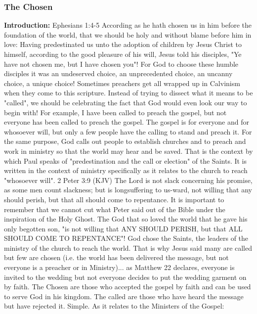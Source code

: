 \subsubsection{The Chosen}
\textbf{Introduction:} Ephesians 1:4-5  According as he hath chosen us in him before the foundation of the world, that we should be holy and without blame before him in love:
Having predestinated us unto the adoption of children by Jesus Christ to himself, according to the good pleasure of his will,
Jesus told his disciples, "Ye have not chosen me, but I have chosen you"!  
For God to choose these humble disciples it was an undeserved choice, an unprecedented choice, an uncanny choice, a unique choice!
Sometimes preachers get all wrapped up in Calvinism when they come to this scripture. Instead of trying to dissect what it means to be "called", we should be celebrating the fact that God would even look our way to begin with!
For example, I have been called to preach the gospel, but not everyone has been called to preach the gospel. The gospel is for everyone and for whosoever will, but only a few people have the calling to stand and preach it. 
For the same purpose, God calls out people to establish churches and to preach and work in ministry so that the world may hear and be saved. That is the context by which Paul speaks of "predestination and the call or election" of the Saints. It is written in the context of ministry specifically as it relates to the church to reach "whosoever will".
2 Peter 3:9 (KJV)  The Lord is not slack concerning his promise, as some men count slackness; but is longsuffering to us-ward, not willing that any should perish, but that all should come to repentance.
It is important to remember that we cannot cut what Peter said out of the Bible under the inspiration of the Holy Ghost. The God that so loved the world that he gave his only begotten son, "is not willing that ANY SHOULD PERISH, but that ALL SHOULD COME TO REPENTANCE"!  God chose the Saints, the leaders of the ministry of the church to reach the world. That is why Jesus said many are called but few are chosen (i.e. the world has been delivered the message, but not everyone is a preacher or in Ministry)... as Matthew 22 declares, everyone is invited to the wedding but not everyone decides to put the wedding garment on by faith. The Chosen are those who accepted the gospel by faith and can be used to serve God in his kingdom. The called are those who have heard the message but have rejected it.  Simple.
As it relates to the Ministers of the Gospel:\\
